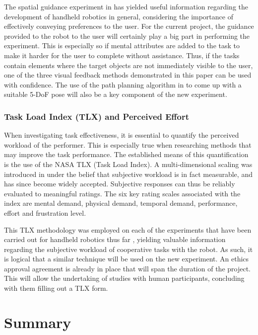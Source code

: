 \documentclass[11pt]{article}
\begin{document}
The spatial guidance experiment in \cite{GreggSmithFeedback} has yielded useful information regarding the development of handheld robotics in general, considering the importance of effectively conveying preferences to the user. For the current project, the guidance provided to the robot to the user will certainly play a big part in performing the experiment. This is especially so if mental attributes are added to the task to make it harder for the user to complete without assistance. Thus, if the tasks contain elements where the target objects are not immediately visible to the user, one of the three visual feedback methods demonstrated in this paper can be used with confidence. The use of the path planning algorithm in \cite{GreggSmithFeedback} to come up with a suitable 5-DoF pose will also be a key component of the new experiment.


\subsubsection{Task Load Index (TLX) and Perceived Effort}

When investigating task effectiveness, it is essential to quantify the perceived workload of the performer. This is especially true when researching methods that may improve the task performance. The established means of this quantification is the use of the NASA TLX (Task Load Index). A multi-dimensional scaling was introduced in \cite{hart1988} under the belief that subjective workload is in fact measurable, and has since become widely accepted. Subjective responses can thus be reliably evaluated to meaningful ratings. The six key rating scales associated with the index are mental demand, physical demand, temporal demand, performance, effort and frustration level. 

This TLX methodology was employed on each of the experiments that have been carried out for handheld robotics thus far \cite{GreggSmithDesign} \cite{GreggSmithFeedback}, yielding valuable information regarding the subjective workload of cooperative tasks with the robot. As such, it is logical that a similar technique will be used on the new experiment. An ethics approval agreement is already in place that will span the duration of the project. This will allow the undertaking of studies with human participants, concluding with them filling out a TLX form. 
\pagebreak




\section{Summary}
\end{document}
